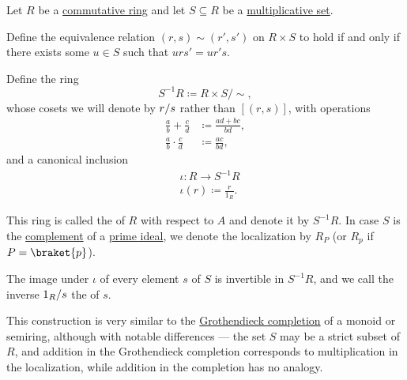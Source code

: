 \begin{definition}\label{def:ring_localization}
  Let \( R \) be a \hyperref[def:ring/commutative]{commutative ring} and let \( S \subseteq R \) be a \hyperref[def:multiplicative_set_in_semiring]{multiplicative set}.

  Define the equivalence relation \( (r, s) \sim (r', s') \) on \( R \times S \) to hold if and only if there exists some \( u \in S \) such that \( u r s' = u r' s \).

  Define the ring
  \begin{equation*}
    S^{-1} R \coloneqq R \times S / \sim,
  \end{equation*}
  whose cosets we will denote by \( r / s \) rather than \( [(r, s)] \), with operations
  \begin{align*}
    \frac a b + \frac c d     &\coloneqq \frac {a d + b c} {b d}, \\
    \frac a b \cdot \frac c d &\coloneqq \frac {a c} {b d},
  \end{align*}
  and a canonical inclusion
  \begin{equation*}
    \begin{aligned}
      &\iota: R \to S^{-1} R \\
      &\iota(r) \coloneqq \frac r {1_R}.
    \end{aligned}
  \end{equation*}

  This ring is called the  of \( R \) with respect to \( A \) and denote it by \( S^{-1} R \). In case \( S \) is the \hyperref[thm:boolean_algebra_of_subsets/complement]{complement} of a \hyperref[def:semiring_ideal/prime]{prime ideal}, we denote the localization by \( R_P \) (or \( R_p \) if \( P = \braket{ p } \)).

  The image under \( \iota \) of every element \( s \) of \( S \) is invertible in \( S^{-1} R \), and we call the inverse \( 1_R / s \) the  of \( s \).

  This construction is very similar to the \hyperref[def:monoid_grothendieck_completion]{Grothendieck completion} of a monoid or semiring, although with notable differences --- the set \( S \) may be a strict subset of \( R \), and addition in the Grothendieck completion corresponds to multiplication in the localization, while addition in the completion has no analogy.
\end{definition}
